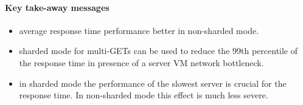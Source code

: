 \documentclass[report.tex]{subfiles}
\begin{document}
\paragraph{Key take-away messages}
\begin{itemize}
	\item average response time performance better in non-sharded mode.
	\item sharded mode for multi-GETs can be used to reduce the 99th percentile of the response time in presence of a server VM network bottleneck.
	\item in sharded mode the performance of the slowest server is crucial for the response time. In non-sharded mode this effect is much less severe.
\end{itemize}
\end{document}
